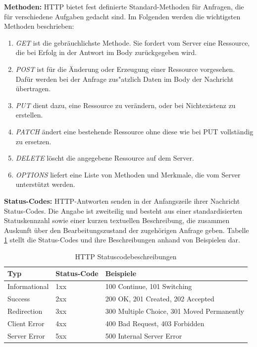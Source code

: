 \noindent
{}
\textbf{Methoden:}
HTTP bietet fest definierte Standard-Methoden für Anfragen, die für verschiedene Aufgaben gedacht sind. Im Folgenden werden die wichtigsten Methoden beschrieben:
\begin{enumerate}
		\item \textit{GET} ist die gebräuchlichste Methode. Sie fordert vom Server eine Ressource, die bei Erfolg in der Antwort im Body zurückgegeben wird. 
		
		\item \textit{POST} ist für die Änderung oder Erzeugung einer Ressource vorgesehen. Dafür werden bei der Anfrage zus"atzlich Daten im Body der Nachricht übertragen.
		
		\item \textit{PUT} dient dazu, eine Ressource zu verändern, oder bei Nichtexistenz zu erstellen.
	
		\item \textit{PATCH} ändert eine bestehende Ressource ohne diese wie bei PUT vollständig zu ersetzen. 
		
		\item \textit{DELETE} löscht die angegebene Ressource auf dem Server.
		
		\item \textit{OPTIONS} liefert eine Liste von Methoden und Merkmale, die vom Server unterstützt werden.
		
\end{enumerate}
\newpage
\noindent
{}
\textbf{Status-Codes:}
HTTP-Antworten senden in der Anfangszeile ihrer Nachricht Status-Codes. Die Angabe ist zweiteilig und besteht aus einer standardisierten Statuskennzahl sowie einer kurzen textuellen Beschreibung, die zusammen Auskunft über den Bearbeitungszustand der zugehörigen Anfrage geben. Tabelle \ref{tab:HTTPStatuscode} stellt die Status-Codes und ihre Beschreibungen anhand von Beispielen dar. \newline

\begin{table}[tbt]
\caption{HTTP Statuscodebeschreibungen}
\label{tab:HTTPStatuscode}
\begin{center}
    \begin{tabular}{ l  l   p{8cm} }
    \toprule
    Typ & Status-Code & Beispiele \\
    \midrule
    
    Informational & 1xx & 100 Continue, 101 Switching\\

    Success & 2xx & 200 OK, 201 Created, 202 Accepted  \\

	Redirection & 3xx & 300 Multiple Choice, 301 Moved Permanently  \\

    Client Error & 4xx & 400 Bad Request, 403 Forbidden\\ 

    Server Error & 5xx & 500 Internal Server Error \\
    \bottomrule
    \end{tabular}
\end{center}
\end{table}

